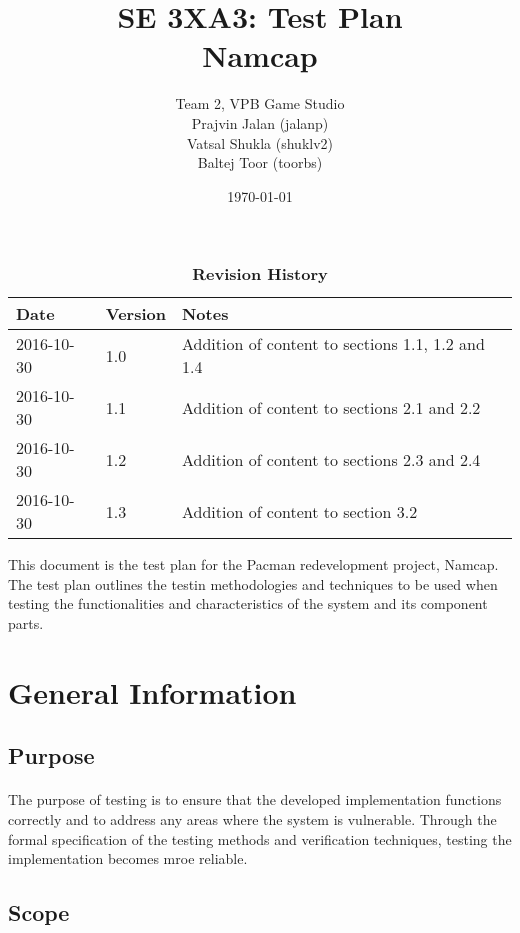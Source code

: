 \documentclass[12pt, titlepage]{article}
\title{SE 3XA3: Test Plan\\Namcap}
\author{Team 2, VPB Game Studio
		\\ Prajvin Jalan (jalanp)
		\\ Vatsal Shukla (shuklv2)
		\\ Baltej Toor (toorbs)
}
\date{\today}
\begin{document}
\maketitle

\tableofcontents
\listoftables
\listoffigures

\begin{table}[bp]
\caption{\bf Revision History}
\begin{tabularx}{\textwidth}{p{3cm}p{2cm}X}
\toprule {\bf Date} & {\bf Version} & {\bf Notes}\\
\midrule
2016-10-30 & 1.0 & Addition of content to sections 1.1, 1.2 and 1.4\\
2016-10-30 & 1.1 & Addition of content to sections 2.1 and 2.2\\
2016-10-30 & 1.2 & Addition of content to sections 2.3 and 2.4\\
2016-10-30 & 1.3 & Addition of content to section 3.2\\
\bottomrule
\end{tabularx}
\end{table}

\newpage


This document is the test plan for the Pacman redevelopment project, Namcap. The test plan outlines the testin methodologies and techniques to be used when testing the functionalities and characteristics of the system and its component parts.

\section{General Information}

\subsection{Purpose}
\paragraph{}
The purpose of testing is to ensure that the developed implementation functions correctly and to address any areas where the system is vulnerable. Through the formal specification of the testing methods and verification techniques, testing the implementation becomes mroe reliable.

\subsection{Scope}
\end{document}
